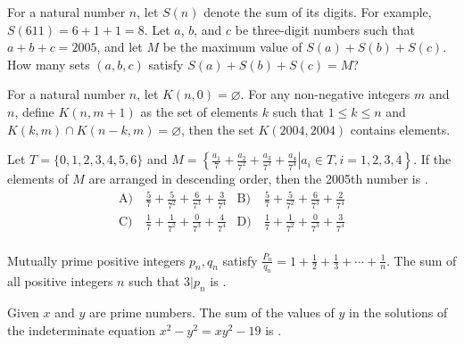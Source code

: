 \begin{problem}\label{Alg24}
For a natural number $n$, let $S(n)$ denote the sum of its digits. For example, $S(611)=6+1+1=8$. Let $a$, $b$, and $c$ be three-digit numbers such that $a+b+c=2005$, and let $M$ be the maximum value of $S(a)+S(b)+S(c)$. How many sets $(a,b,c)$ satisfy $S(a)+S(b)+S(c)=M$?
\end{problem}


\begin{problem}\label{Alg25}
For a natural number $n$, let $K(n,0)=\varnothing$. For any non-negative integers $m$ and $n$, define $K(n,m+1)$ as the set of elements $k$ such that $1\leq k\leq n$ and $K(k,m)\cap K(n-k,m)=\varnothing$, then the set $K(2004,2004)$ contains \underline{\hspace{2cm}} elements.

\end{problem}




\begin{problem}\label{Alg26}
Let $T=\{0,1,2,3,4,5,6\}$ and $M=\left\{\left.\frac{a_1}{7}+\frac{a_2}{7^2}+\frac{a_3}{7^3}+\frac{a_4}{7^4}\right|a_i\in T,i=1,2,3,4\right\}$. If the elements of $M$ are arranged in descending order, then the 2005th number is \underline{\hspace{2cm}}.
\begin{align*}
\text{A)}\ & \frac{5}{7}+\frac{5}{7^2}+\frac{6}{7^3}+\frac{3}{7^4}&
\text{B)}\ & \frac{5}{7}+\frac{5}{7^2}+\frac{6}{7^3}+\frac{2}{7^4}\\
\text{C)}\ & \frac{1}{7}+\frac{1}{7^2}+\frac{0}{7^3}+\frac{4}{7^4}&
\text{D)}\ & \frac{1}{7}+\frac{1}{7^2}+\frac{0}{7^3}+\frac{3}{7^4} \\
\end{align*} 

\end{problem}

\begin{problem}\label{Alg27}
Mutually prime positive integers $p_n, q_n$ satisfy $\frac{P_n}{q_n}=1+\frac12+\frac13+\cdots+\frac1n$. The sum of all positive integers $n$ such that $3|p_n$ is \underline{\hspace{2cm}}.	
\end{problem}


\begin{problem}\label{Alg28}
Given $x$ and $y$ are prime numbers. The sum of the values of $y$ in the solutions of the indeterminate equation $x^2-y^2=xy^2-19$ is \underline{\hspace{2cm}}.
\end{problem}



